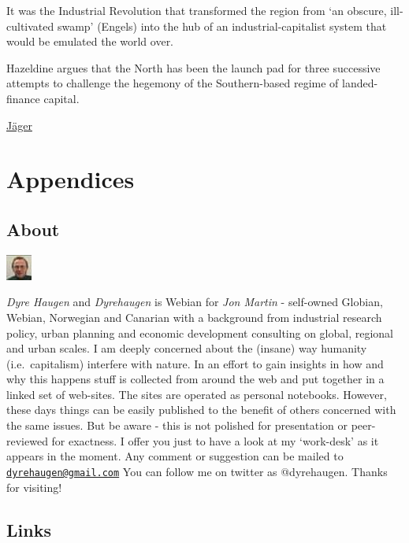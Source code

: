 \documentclass[
]{book}
\begin{document}
It was the Industrial Revolution that transformed the region from `an obscure, ill-cultivated swamp' (Engels) into the hub of an industrial-capitalist system that would be emulated the world over.

Hazeldine argues that the North has been the launch pad for three successive attempts to challenge the hegemony of the Southern-based regime of landed-finance capital.

\href{https://newleftreview.org/issues/ii128/articles/anton-jager-rebel-regions}{Jäger}

\hypertarget{part-appendices}{%
\part{Appendices}\label{part-appendices}}

\hypertarget{appendix-appendices}{%
\appendix}


\hypertarget{about}{%
\chapter{About}\label{about}}

\includegraphics{fig/me.jpg}

\emph{Dyre Haugen} and \emph{Dyrehaugen} is Webian for \emph{Jon Martin} -
self-owned Globian, Webian, Norwegian and Canarian with
a background from industrial research policy, urban planning and
economic development consulting on global, regional and urban scales.
I am deeply concerned about the (insane) way
humanity (i.e.~capitalism) interfere with nature.
In an effort to gain insights in how and why this happens
stuff is collected from around the web and put together
in a linked set of web-sites.
The sites are operated as personal notebooks.
However, these days things can be easily published to the
benefit of others concerned with the same issues.
But be aware - this is not polished for presentation or
peer-reviewed for exactness.
I offer you just to have a look at my `work-desk' as it appears in the moment.
Any comment or suggestion can be mailed to \href{mailto:dyrehaugen@gmail.com}{\nolinkurl{dyrehaugen@gmail.com}}
You can follow me on twitter as @dyrehaugen.
Thanks for visiting!

\hypertarget{links}{%
\chapter{Links}\label{links}}
\end{document}
